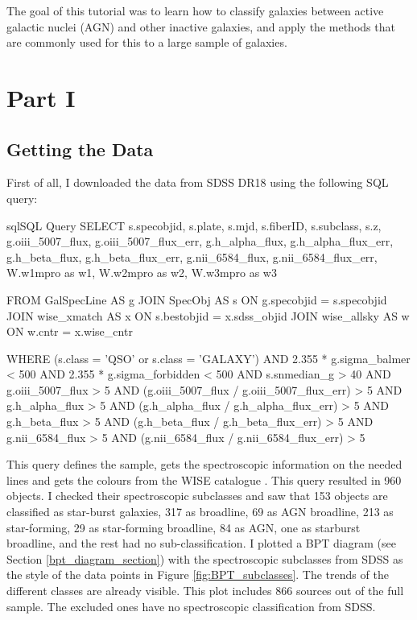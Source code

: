 \documentclass[letterpaper, oneside]{article}
\begin{document}
	
\templatePagecfg


The goal of this tutorial was to learn how to classify galaxies between active galactic nuclei (AGN) and other inactive galaxies, and apply the methods that are commonly used for this to a large sample of galaxies.

\section{Part I}

\subsection{Getting the Data}

First of all, I downloaded the data from SDSS DR18 \cite{sdss_dr18} using the following SQL query:

\begin{sourcecode}[\label{sdss_query}]{sql}{SQL Query}
SELECT s.specobjid, s.plate, s.mjd, s.fiberID, s.subclass, s.z, 
g.oiii_5007_flux, g.oiii_5007_flux_err, 
g.h_alpha_flux, g.h_alpha_flux_err, 
g.h_beta_flux, g.h_beta_flux_err, 
g.nii_6584_flux, g.nii_6584_flux_err, 
W.w1mpro as w1, W.w2mpro as w2, W.w3mpro as w3

FROM GalSpecLine AS g 
JOIN SpecObj AS s ON g.specobjid = s.specobjid
JOIN wise_xmatch AS x ON s.bestobjid = x.sdss_objid
JOIN wise_allsky AS w ON w.cntr = x.wise_cntr

WHERE
(s.class = 'QSO' or s.class = 'GALAXY')
AND 2.355 * g.sigma_balmer < 500
AND 2.355 * g.sigma_forbidden < 500
AND s.snmedian_g > 40
AND g.oiii_5007_flux > 5
AND (g.oiii_5007_flux / g.oiii_5007_flux_err) > 5
AND g.h_alpha_flux > 5
AND (g.h_alpha_flux / g.h_alpha_flux_err) > 5
AND g.h_beta_flux > 5
AND (g.h_beta_flux / g.h_beta_flux_err) > 5
AND g.nii_6584_flux > 5
AND (g.nii_6584_flux / g.nii_6584_flux_err) > 5
\end{sourcecode}

This query defines the sample, gets the spectroscopic information on the needed lines and gets the colours from the WISE catalogue \cite{wise_allsky}. This query resulted in 960 objects. I checked their spectroscopic subclasses and saw that 153 objects are classified as star-burst galaxies, 317 as broadline, 69 as AGN broadline, 213 as star-forming, 29 as star-forming broadline, 84 as AGN, one as starburst broadline, and the rest had no sub-classification. I plotted a BPT diagram (see Section \ref{bpt_diagram_section}) with the spectroscopic subclasses from SDSS as the style of the data points in Figure \ref{fig:BPT_subclasses}. The trends of the different classes are already visible. This plot includes 866 sources out of the full sample. The excluded ones have no spectroscopic classification from SDSS.
\end{document}
